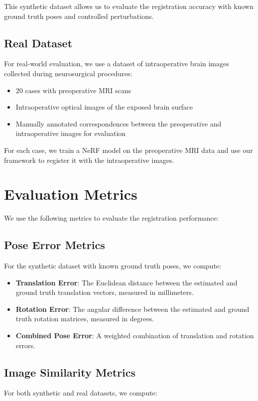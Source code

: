 This synthetic dataset allows us to evaluate the registration accuracy with known ground truth poses and controlled perturbations.

\subsection{Real Dataset}
For real-world evaluation, we use a dataset of intraoperative brain images collected during neurosurgical procedures:

\begin{itemize}
    \item 20 cases with preoperative MRI scans
    \item Intraoperative optical images of the exposed brain surface
    \item Manually annotated correspondences between the preoperative and intraoperative images for evaluation
\end{itemize}

For each case, we train a NeRF model on the preoperative MRI data and use our framework to register it with the intraoperative images.

\section{Evaluation Metrics}
We use the following metrics to evaluate the registration performance:

\subsection{Pose Error Metrics}
For the synthetic dataset with known ground truth poses, we compute:

\begin{itemize}
    \item \textbf{Translation Error}: The Euclidean distance between the estimated and ground truth translation vectors, measured in millimeters.
    \item \textbf{Rotation Error}: The angular difference between the estimated and ground truth rotation matrices, measured in degrees.
    \item \textbf{Combined Pose Error}: A weighted combination of translation and rotation errors.
\end{itemize}

\subsection{Image Similarity Metrics}
For both synthetic and real datasets, we compute:

